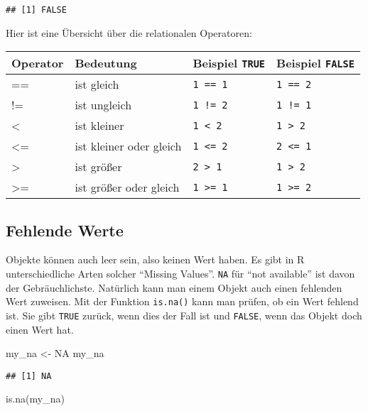 \documentclass[
]{book}
\newenvironment{Shaded}{\begin{snugshade}}{\end{snugshade}}
\newcommand{\ConstantTok}[1]{\textcolor[rgb]{0.00,0.00,0.00}{#1}}
\newcommand{\FunctionTok}[1]{\textcolor[rgb]{0.00,0.00,0.00}{#1}}
\newcommand{\NormalTok}[1]{#1}
\newcommand{\OtherTok}[1]{\textcolor[rgb]{0.56,0.35,0.01}{#1}}
\begin{document}
\begin{verbatim}
## [1] FALSE
\end{verbatim}

Hier ist eine Übersicht über die relationalen Operatoren:

\begin{longtable}[]{@{}llll@{}}
\toprule
Operator & Bedeutung & Beispiel \texttt{TRUE} & Beispiel \texttt{FALSE}\tabularnewline
\midrule
\endhead
== & ist gleich & \texttt{1\ ==\ 1} & \texttt{1\ ==\ 2}\tabularnewline
!= & ist ungleich & \texttt{1\ !=\ 2} & \texttt{1\ !=\ 1}\tabularnewline
\textless{} & ist kleiner & \texttt{1\ \textless{}\ 2} & \texttt{1\ \textgreater{}\ 2}\tabularnewline
\textless= & ist kleiner oder gleich & \texttt{1\ \textless{}=\ 2} & \texttt{2\ \textless{}=\ 1}\tabularnewline
\textgreater{} & ist größer & \texttt{2\ \textgreater{}\ 1} & \texttt{1\ \textgreater{}\ 2}\tabularnewline
\textgreater= & ist größer oder gleich & \texttt{1\ \textgreater{}=\ 1} & \texttt{1\ \textgreater{}=\ 2}\tabularnewline
\bottomrule
\end{longtable}

\hypertarget{fehlende-werte}{%
\subsection{Fehlende Werte}\label{fehlende-werte}}

Objekte können auch leer sein, also keinen Wert haben. Es gibt in R unterschiedliche Arten solcher ``Missing Values''. \texttt{NA} für ``not available'' ist davon der Gebräuchlichste. Natürlich kann man einem Objekt auch einen fehlenden Wert zuweisen. Mit der Funktion \texttt{is.na()} kann man prüfen, ob ein Wert fehlend ist. Sie gibt \texttt{TRUE} zurück, wenn dies der Fall ist und \texttt{FALSE}, wenn das Objekt doch einen Wert hat.

\begin{Shaded}
\begin{Highlighting}[]
\NormalTok{my\_na }\OtherTok{\textless{}{-}} \ConstantTok{NA}
\NormalTok{my\_na}
\end{Highlighting}
\end{Shaded}

\begin{verbatim}
## [1] NA
\end{verbatim}

\begin{Shaded}
\begin{Highlighting}[]
\FunctionTok{is.na}\NormalTok{(my\_na)}
\end{Highlighting}
\end{Shaded}
\end{document}
